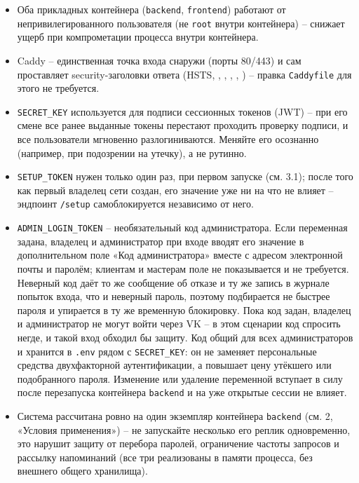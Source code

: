 
\begin{itemize}
  \item Оба прикладных контейнера (\texttt{backend}, \texttt{frontend})
        работают от непривилегированного пользователя (не \texttt{root}
        внутри контейнера) -- снижает ущерб при компрометации процесса
        внутри контейнера.
  \item Caddy -- единственная точка входа снаружи (порты 80/443) и сам
        проставляет security-заголовки ответа (HSTS,
        , ,
        , ,
        ) -- правка \texttt{Caddyfile}
        для этого не требуется.
  \item \texttt{SECRET\_KEY} используется для подписи сессионных
        токенов (JWT) -- при его смене все ранее выданные токены
        перестают проходить проверку подписи, и все пользователи
        мгновенно разлогиниваются. Меняйте его осознанно (например,
        при подозрении на утечку), а не рутинно.
  \item \texttt{SETUP\_TOKEN} нужен только один раз, при первом запуске
        (см. 3.1); после того как первый владелец сети создан, его
        значение уже ни на что не влияет -- эндпоинт \texttt{/setup}
        самоблокируется независимо от него.
  \item \texttt{ADMIN\_LOGIN\_TOKEN} -- необязательный код администратора.
        Если переменная задана, владелец и администратор при входе вводят
        его значение в дополнительном поле «Код администратора» вместе с
        адресом электронной почты и паролём; клиентам и мастерам поле не
        показывается и не требуется. Неверный код даёт то же сообщение об
        отказе и ту же запись в журнале попыток входа, что и неверный
        пароль, поэтому подбирается не быстрее пароля и упирается в ту же
        временную блокировку. Пока код задан, владелец и администратор не
        могут войти через VK -- в этом сценарии код спросить негде,
        и такой вход обходил бы защиту. Код общий для всех администраторов
        и хранится в \texttt{.env} рядом с \texttt{SECRET\_KEY}: он не
        заменяет персональные средства двухфакторной аутентификации, а
        повышает цену утёкшего или подобранного пароля. Изменение или
        удаление переменной вступает в силу после перезапуска контейнера
        \texttt{backend} и на уже открытые сессии не влияет.
  \item Система рассчитана ровно на один экземпляр контейнера
        \texttt{backend} (см. 2, «Условия применения») -- не
        запускайте несколько его реплик одновременно, это нарушит
        защиту от перебора паролей, ограничение частоты запросов и
        рассылку напоминаний (все три реализованы в памяти процесса,
        без внешнего общего хранилища).
\end{itemize}

